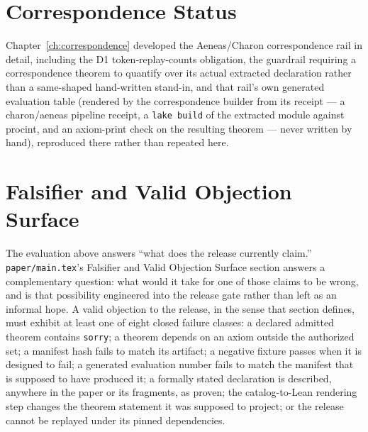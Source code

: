 

\section{Correspondence Status}
\label{sec:eval-correspondence}

Chapter~\ref{ch:correspondence} developed the Aeneas/Charon correspondence
rail in detail, including the D1 token-replay-counts obligation, the
guardrail requiring a correspondence theorem to quantify over its actual
extracted declaration rather than a same-shaped hand-written stand-in, and
that rail's own generated evaluation table (rendered by the correspondence
builder from its receipt --- a charon/aeneas pipeline receipt, a
\texttt{lake build} of the extracted module against \textsf{procint}, and
an axiom-print check on the resulting theorem --- never written by hand),
reproduced there rather than repeated here.

\section{Falsifier and Valid Objection Surface}
\label{sec:eval-falsifier}

The evaluation above answers ``what does the release currently claim.''
\texttt{paper/main.tex}'s Falsifier and Valid Objection Surface section
answers a complementary question: what would it take for one of those
claims to be wrong, and is that possibility engineered into the release
gate rather than left as an informal hope. A valid objection to the
release, in the sense that section defines, must exhibit at least one of
eight closed failure classes: a declared admitted theorem contains
\texttt{sorry}; a theorem depends on an axiom outside the authorized set;
a manifest hash fails to match its artifact; a negative fixture passes
when it is designed to fail; a generated evaluation number fails to match
the manifest that is supposed to have produced it; a formally stated
declaration is described, anywhere in the paper or its fragments, as
proven; the catalog-to-Lean rendering step changes the theorem statement
it was supposed to project; or the release cannot be replayed under its
pinned dependencies.

